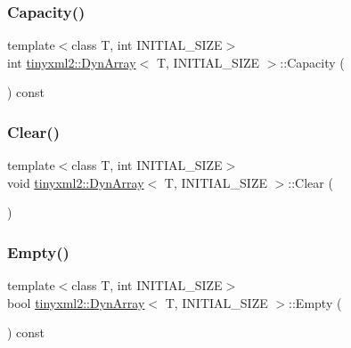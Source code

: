 \subsubsection{\texorpdfstring{Capacity()}{Capacity()}}
{\footnotesize\ttfamily template$<$class T, int I\+N\+I\+T\+I\+A\+L\+\_\+\+S\+I\+ZE$>$ \\
int \hyperlink{classtinyxml2_1_1_dyn_array}{tinyxml2\+::\+Dyn\+Array}$<$ T, I\+N\+I\+T\+I\+A\+L\+\_\+\+S\+I\+ZE $>$\+::Capacity (\begin{DoxyParamCaption}{ }\end{DoxyParamCaption}) const\hspace{0.3cm}{\ttfamily [inline]}}

\mbox{\label{classtinyxml2_1_1_dyn_array_af87a804cd831226d069274b44b74b8bc}} 
\subsubsection{\texorpdfstring{Clear()}{Clear()}}
{\footnotesize\ttfamily template$<$class T, int I\+N\+I\+T\+I\+A\+L\+\_\+\+S\+I\+ZE$>$ \\
void \hyperlink{classtinyxml2_1_1_dyn_array}{tinyxml2\+::\+Dyn\+Array}$<$ T, I\+N\+I\+T\+I\+A\+L\+\_\+\+S\+I\+ZE $>$\+::Clear (\begin{DoxyParamCaption}{ }\end{DoxyParamCaption})\hspace{0.3cm}{\ttfamily [inline]}}

\mbox{\label{classtinyxml2_1_1_dyn_array_a044fc26f44ed3e96ffaeac542188149e}} 
\subsubsection{\texorpdfstring{Empty()}{Empty()}}
{\footnotesize\ttfamily template$<$class T, int I\+N\+I\+T\+I\+A\+L\+\_\+\+S\+I\+ZE$>$ \\
bool \hyperlink{classtinyxml2_1_1_dyn_array}{tinyxml2\+::\+Dyn\+Array}$<$ T, I\+N\+I\+T\+I\+A\+L\+\_\+\+S\+I\+ZE $>$\+::Empty (\begin{DoxyParamCaption}{ }\end{DoxyParamCaption}) const\hspace{0.3cm}{\ttfamily [inline]}}

